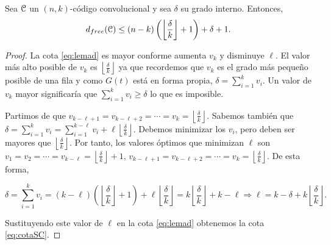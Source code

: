 \begin{teorema}\label{th:singleton2}
Sea $\mathcal C$ un $(n,k)$-código convolucional y sea $\delta$ su grado interno. Entonces, \begin{equation} \label{eq:cotaSC} d_{free}(\mathcal C) \leq (n-k)\left(\left\lfloor \frac{\delta}{k}\right\rfloor + 1\right) + \delta + 1.\end{equation}
\end{teorema}

\begin{proof}
\phantom{\\}
La cota \eqref{eq:lemad} es mayor conforme aumenta $v_k$ y disminuye $\ell$. El valor más alto posible de $v_k$ es $\left\lfloor \frac{\delta}{k} \right\rfloor$ ya que recordemos que $v_k$ es el grado más pequeño posible de una fila y como $G(t)$ está en forma propia, $\delta = \sum_{i=1}^{k} v_i$. Un valor de $v_k$ mayor significaría que $\sum_{i=1}^{k} v_i \geq \delta$ lo que es imposible. 

Partimos de que $v_{k-\ell + 1} = v_{k-\ell + 2} = \cdots = v_{k} = \left\lfloor \frac{\delta}{k} \right\rfloor$. Sabemos también que $ \delta = \sum_{i=1}^{k} v_i = \sum_{i=1}^{k-\ell} v_i + \ell  \left\lfloor \frac{\delta}{k} \right\rfloor$. Debemos minimizar los $v_i$, pero deben ser mayores que $\left\lfloor \frac{\delta}{k} \right\rfloor$. Por tanto, los valores óptimos que minimizan $\ell$ son $v_1 = v_2 = \cdots = v_{k-\ell} = \left\lfloor \frac{\delta}{k} \right\rfloor + 1$, $v_{k-\ell + 1} = v_{k-\ell + 2} = \cdots = v_{k} = \left\lfloor \frac{\delta}{k} \right\rfloor$. De esta forma, 

$$ \delta = \sum_{i=1}^{k} v_i = (k - \ell)(\left\lfloor \frac{\delta}{k} \right\rfloor + 1) + \ell\left\lfloor \frac{\delta}{k} \right\rfloor = k\left\lfloor \frac{\delta}{k} \right\rfloor + k - \ell \Rightarrow \ell = k - \delta + k\left\lfloor \frac{\delta}{k} \right\rfloor.$$

Sustituyendo este valor de $\ell$ en la cota \eqref{eq:lemad} obtenemos la cota \eqref{eq:cotaSC}. 



\end{proof}





\endinput